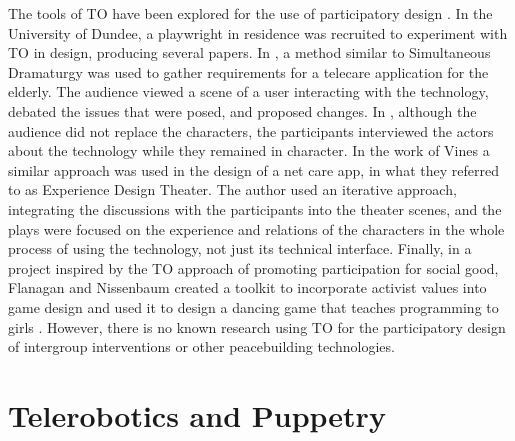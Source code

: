 \documentclass[dissertation,math,vertlayout,pdfa,colorlinks]{aaltoseries}
\begin{document}
The tools of TO have been explored for the use of participatory design \cite{macchiaExploringTheaterOppressed2016}. In the University of Dundee, a playwright in residence was recruited to experiment with TO in design, producing several papers. In \cite{morganRequirementsGatheringDiverse2008}, a method similar to Simultaneous Dramaturgy was used to gather requirements for a telecare application for the elderly. The audience viewed a scene of a user interacting with the technology, debated the issues that were posed, and proposed changes. In \cite{riceForumTheatreRequirements2007,newellUseTheatreRequirements2006}, although the audience did not replace the characters, the participants interviewed the actors about the technology while they remained in character. In the work of Vines \cite{vinesExperienceDesignTheatre2014, vinesPlayingProvocations2018} a similar approach was used in the design of a net care app, in what they referred to as Experience Design Theater. The author used an iterative approach, integrating the discussions with the participants into the theater scenes, and the plays were focused on the experience and relations of the characters in the whole process of using the technology, not just its technical interface. Finally, in a project inspired by the TO approach of promoting participation for social good, Flanagan and Nissenbaum created a toolkit to incorporate activist values into game design and used it to design a dancing game that teaches programming to girls \cite{flanaganGameDesignMethodology2007}. However, there is no known research using TO for the participatory design of intergroup interventions or other peacebuilding technologies. 

\section{Telerobotics and Puppetry}
\end{document}
